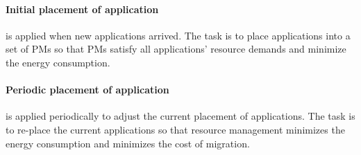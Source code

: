 \paragraph{Initial placement of application} is applied when new applications arrived. The task is to place applications into a set of PMs \cite{Mishra:2012kx} so that PMs satisfy all applications' resource demands and minimize the energy consumption.



\paragraph{Periodic placement of application} is applied periodically to adjust the current placement of applications. The task is to re-place the current applications so that resource management minimizes the energy consumption and minimizes the cost of migration.



